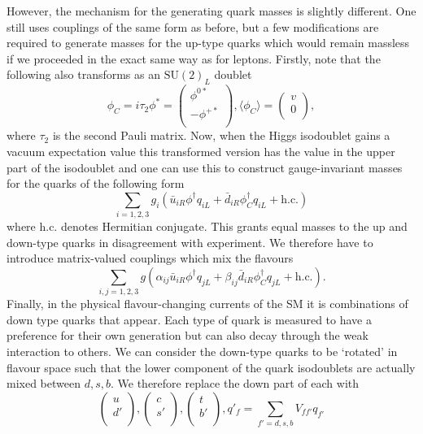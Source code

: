 However, the mechanism for the generating quark masses is slightly different. One still uses couplings of the same form as before, but a few modifications are required to generate masses for the up-type quarks which would remain massless if we proceeded in the exact same way as for leptons. Firstly, note that the following also transforms as an $\mathrm{SU}(2)_{L}$ doublet 
\begin{equation}
    \phi_{C} = i\tau_{2}\phi^{*} = 
    \begin{pmatrix}
        \phi^{0*} \\
        -\phi^{+*}\\
    \end{pmatrix},
    \langle{\phi_{C}}\rangle = 
    \begin{pmatrix} 
        v \\ 
        0 \\ 
    \end{pmatrix},
\end{equation}
where $\tau_{2}$ is the second Pauli matrix. Now, when the Higgs isodoublet gains a vacuum expectation value this transformed version has the value in the upper part of the isodoublet and one can use this to construct gauge-invariant masses for the quarks of the following form
\begin{equation}
    \sum_{i=1,2,3}g_{i}(
    \bar{u}_{iR}\phi^{\dag}q_{iL} 
    + \bar{d}_{iR}\phi^{\dag}_{C}q_{iL}
    + \mathrm{h.c.})
\end{equation}
where h.c. denotes Hermitian conjugate. This grants equal masses to the up and down-type quarks in disagreement with experiment. We therefore have to introduce matrix-valued couplings which mix the flavours
\begin{equation}
    \sum_{i,j=1,2,3}g(
      \alpha_{ij}\bar{u}_{iR}\phi^{\dag}q_{jL} 
      + \beta_{ij}\bar{d}_{iR}\phi^{\dag}_{C}q_{jL}
      + \mathrm{h.c.}).
\end{equation}
Finally, in the physical flavour-changing currents of the SM it is combinations of down type quarks that appear. Each type of quark is measured to have a preference for their own generation but can also decay through the weak interaction to others. We can consider the down-type quarks to be `rotated' in flavour space such that the lower component of the quark isodoublets are actually mixed between $d,s,b$. We therefore replace the down part of each with 
\begin{equation}
    \begin{pmatrix}
        u \\
        d{'} \\
    \end{pmatrix},
    \begin{pmatrix}
        c \\
        s{'} \\
    \end{pmatrix},
    \begin{pmatrix}
        t \\
        b{'} \\
    \end{pmatrix},
    q{'}_{f} = \sum_{f'=d,s,b}V_{ff'}q_{f'}
\end{equation}
